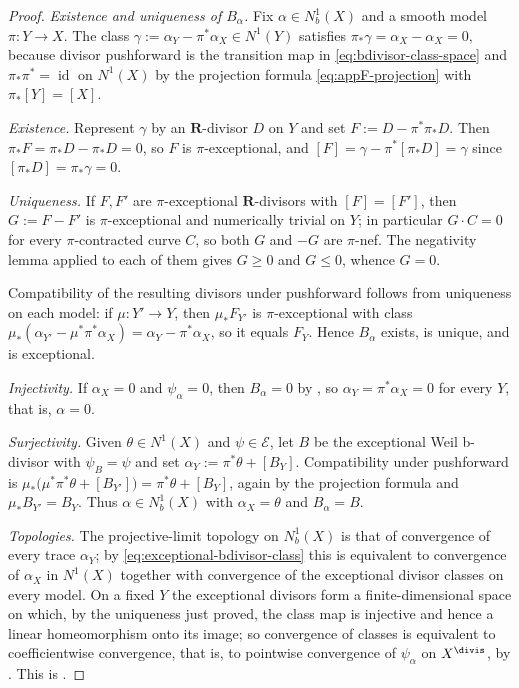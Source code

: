 \begin{proof}
\emph{Existence and uniqueness of $B_\alpha$.}  Fix
$\alpha\in N^1_b(X)$ and a smooth model $\pi:Y\to X$.  The class
$\gamma:=\alpha_Y-\pi^*\alpha_X\in N^1(Y)$ satisfies
$\pi_*\gamma=\alpha_X-\alpha_X=0$, because divisor pushforward is the
transition map in \eqref{eq:bdivisor-class-space} and
$\pi_*\pi^*=\operatorname{id}$ on $N^1(X)$ by the projection formula
\eqref{eq:appF-projection} with $\pi_*[Y]=[X]$.

\emph{Existence.}  Represent $\gamma$ by an $\mathbf R$-divisor $D$ on
$Y$ and set $F:=D-\pi^*\pi_*D$.  Then
$\pi_*F=\pi_*D-\pi_*D=0$, so $F$ is $\pi$-exceptional, and
$[F]=\gamma-\pi^*[\pi_*D]=\gamma$ since $[\pi_*D]=\pi_*\gamma=0$.

\emph{Uniqueness.}  If $F,F'$ are $\pi$-exceptional $\mathbf R$-divisors
with $[F]=[F']$, then $G:=F-F'$ is $\pi$-exceptional and numerically
trivial on $Y$; in particular $G\cdot C=0$ for every $\pi$-contracted
curve $C$, so both $G$ and $-G$ are $\pi$-nef.  The negativity
lemma \cite[Lemma~3.39]{KM08} applied to each of them gives $G\geq0$ and
$G\leq0$, whence $G=0$.

Compatibility of the resulting divisors under pushforward follows from
uniqueness on each model: if $\mu:Y'\to Y$, then $\mu_*F_{Y'}$ is
$\pi$-exceptional with class $\mu_*(\alpha_{Y'}-\mu^*\pi^*\alpha_X)
=\alpha_Y-\pi^*\alpha_X$, so it equals $F_Y$.  Hence $B_\alpha$
exists, is unique, and is exceptional.

\emph{Injectivity.}  If $\alpha_X=0$ and $\psi_\alpha=0$, then
$B_\alpha=0$ by , so
$\alpha_Y=\pi^*\alpha_X=0$ for every $Y$, that is, $\alpha=0$.

\emph{Surjectivity.}  Given $\theta\in N^1(X)$ and $\psi\in\mathcal E$,
let $B$ be the exceptional Weil b-divisor with $\psi_B=\psi$ and set
$\alpha_Y:=\pi^*\theta+[B_Y]$.  Compatibility under pushforward is
$\mu_*\bigl(\mu^*\pi^*\theta+[B_{Y'}]\bigr)=\pi^*\theta+[B_Y]$, again by
the projection formula and $\mu_*B_{Y'}=B_Y$.  Thus
$\alpha\in N^1_b(X)$ with $\alpha_X=\theta$ and
$B_\alpha=B$.

\emph{Topologies.}  The projective-limit topology on $N^1_b(X)$ is that of
convergence of every trace $\alpha_Y$; by
\eqref{eq:exceptional-bdivisor-class} this is equivalent to convergence of
$\alpha_X$ in $N^1(X)$ together with convergence of the exceptional
divisor classes on every model.  On a fixed $Y$ the exceptional divisors
form a finite-dimensional space on which, by the uniqueness just proved, the
class map is injective and hence a linear homeomorphism onto its image; so
convergence of classes is equivalent to coefficientwise convergence, that
is, to pointwise convergence of $\psi_\alpha$ on $X^{\divis}$, by
.  This is
\cite[Lemma~6.39]{BJ22}.
\end{proof}

